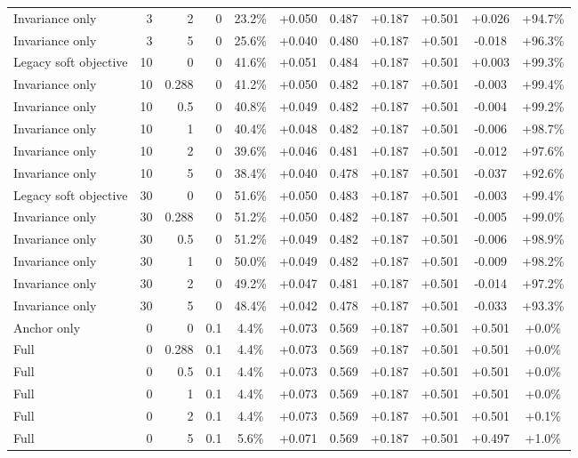 \begin{table}[htbp]
\begin{tabular}{lrrrccccccc}
Invariance only & 3 & 2 & 0 & 23.2\% & +0.050 & 0.487 & +0.187 & +0.501 & +0.026 & +94.7\% \\
Invariance only & 3 & 5 & 0 & 25.6\% & +0.040 & 0.480 & +0.187 & +0.501 & -0.018 & +96.3\% \\
Legacy soft objective & 10 & 0 & 0 & 41.6\% & +0.051 & 0.484 & +0.187 & +0.501 & +0.003 & +99.3\% \\
Invariance only & 10 & 0.288 & 0 & 41.2\% & +0.050 & 0.482 & +0.187 & +0.501 & -0.003 & +99.4\% \\
Invariance only & 10 & 0.5 & 0 & 40.8\% & +0.049 & 0.482 & +0.187 & +0.501 & -0.004 & +99.2\% \\
Invariance only & 10 & 1 & 0 & 40.4\% & +0.048 & 0.482 & +0.187 & +0.501 & -0.006 & +98.7\% \\
Invariance only & 10 & 2 & 0 & 39.6\% & +0.046 & 0.481 & +0.187 & +0.501 & -0.012 & +97.6\% \\
Invariance only & 10 & 5 & 0 & 38.4\% & +0.040 & 0.478 & +0.187 & +0.501 & -0.037 & +92.6\% \\
Legacy soft objective & 30 & 0 & 0 & 51.6\% & +0.050 & 0.483 & +0.187 & +0.501 & -0.003 & +99.4\% \\
Invariance only & 30 & 0.288 & 0 & 51.2\% & +0.050 & 0.482 & +0.187 & +0.501 & -0.005 & +99.0\% \\
Invariance only & 30 & 0.5 & 0 & 51.2\% & +0.049 & 0.482 & +0.187 & +0.501 & -0.006 & +98.9\% \\
Invariance only & 30 & 1 & 0 & 50.0\% & +0.049 & 0.482 & +0.187 & +0.501 & -0.009 & +98.2\% \\
Invariance only & 30 & 2 & 0 & 49.2\% & +0.047 & 0.481 & +0.187 & +0.501 & -0.014 & +97.2\% \\
Invariance only & 30 & 5 & 0 & 48.4\% & +0.042 & 0.478 & +0.187 & +0.501 & -0.033 & +93.3\% \\
Anchor only & 0 & 0 & 0.1 & 4.4\% & +0.073 & 0.569 & +0.187 & +0.501 & +0.501 & +0.0\% \\
Full & 0 & 0.288 & 0.1 & 4.4\% & +0.073 & 0.569 & +0.187 & +0.501 & +0.501 & +0.0\% \\
Full & 0 & 0.5 & 0.1 & 4.4\% & +0.073 & 0.569 & +0.187 & +0.501 & +0.501 & +0.0\% \\
Full & 0 & 1 & 0.1 & 4.4\% & +0.073 & 0.569 & +0.187 & +0.501 & +0.501 & +0.0\% \\
Full & 0 & 2 & 0.1 & 4.4\% & +0.073 & 0.569 & +0.187 & +0.501 & +0.501 & +0.1\% \\
Full & 0 & 5 & 0.1 & 5.6\% & +0.071 & 0.569 & +0.187 & +0.501 & +0.497 & +1.0\% \\

\end{tabular}
\end{table}
